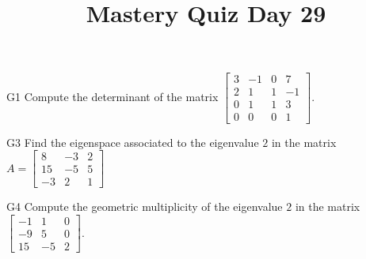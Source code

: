 \documentclass{sbgLAquiz}
\title{Mastery Quiz Day 29 }
\begin{document}
\begin{problem}{G1}
Compute the determinant of the matrix $\begin{bmatrix} 3 & -1 & 0  & 7 \\ 2 & 1 & 1 & -1  \\ 0 & 1 & 1 & 3 \\ 0 & 0 & 0 & 1   \end{bmatrix}$.
\end{problem}

\begin{problem}{G3}
Find the eigenspace associated to the eigenvalue $2$ in the matrix $A=\begin{bmatrix}8 & -3 & 2 \\ 15 & -5 & 5 \\ -3 & 2 & 1\end{bmatrix}$
\end{problem}
\newpage

\begin{problem}{G4}
Compute the geometric multiplicity of the eigenvalue $2$ in the matrix $\begin{bmatrix} -1 & 1 & 0 \\ -9 & 5 & 0 \\ 15 & -5 & 2 \end{bmatrix}$.
\end{problem}
\end{document}
